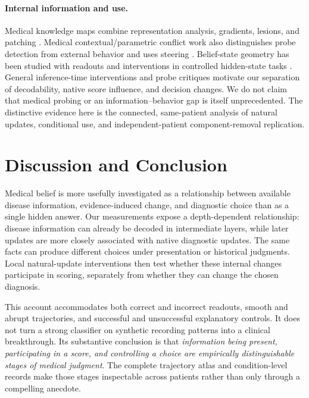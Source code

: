 \documentclass[11pt]{article}
\begin{document}
\paragraph{Internal information and use.}
Medical knowledge maps combine representation analysis, gradients, lesions, and patching \citep{medicalmaps}. Medical contextual/parametric conflict work also distinguishes probe detection from external behavior and uses steering \citep{minpair}. Belief-state geometry has been studied with readouts and interventions in controlled hidden-state tasks \citep{beliefgeometry}. General inference-time interventions \citep{iti} and probe critiques \citep{probing,contextprobe} motivate our separation of decodability, native score influence, and decision changes. We do not claim that medical probing or an information--behavior gap is itself unprecedented. The distinctive evidence here is the connected, same-patient analysis of natural updates, conditional use, and independent-patient component-removal replication.

\section{Discussion and Conclusion}
Medical belief is more usefully investigated as a relationship between available disease information, evidence-induced change, and diagnostic choice than as a single hidden answer. Our measurements expose a depth-dependent relationship: disease information can already be decoded in intermediate layers, while later updates are more closely associated with native diagnostic updates. The same facts can produce different choices under presentation or historical judgments. Local natural-update interventions then test whether these internal changes participate in scoring, separately from whether they can change the chosen diagnosis.

This account accommodates both correct and incorrect readouts, smooth and abrupt trajectories, and successful and unsuccessful explanatory controls. It does not turn a strong classifier on synthetic recording patterns into a clinical breakthrough. Its substantive conclusion is that \emph{information being present, participating in a score, and controlling a choice are empirically distinguishable stages of medical judgment}. The complete trajectory atlas and condition-level records make those stages inspectable across patients rather than only through a compelling anecdote.
\end{document}
